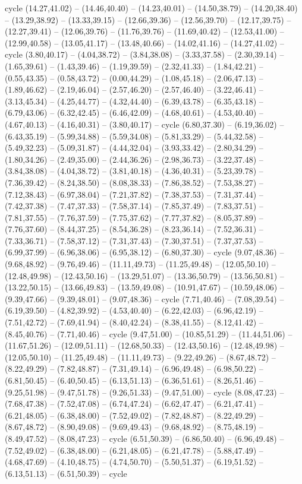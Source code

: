 {cycle (14.27,41.02) -- (14.46,40.40) -- (14.23,40.01) -- (14.50,38.79) -- (14.20,38.40) -- (13.29,38.92) -- (13.33,39.15) -- (12.66,39.36) -- (12.56,39.70) -- (12.17,39.75) -- (12.27,39.41) -- (12.06,39.76) -- (11.76,39.76) -- (11.69,40.42) -- (12.53,41.00) -- (12.99,40.58) -- (13.05,41.17) -- (13.48,40.66) -- (14.02,41.16) -- (14.27,41.02) -- cycle (3.80,40.17) -- (4.04,38.72) -- (3.84,38.08) -- (3.33,37.58) -- (2.30,39.14) -- (1.65,39.61) -- (1.43,39.46) -- (1.19,39.59) -- (2.32,41.33) -- (1.84,42.21) -- (0.55,43.35) -- (0.58,43.72) -- (0.00,44.29) -- (1.08,45.18) -- (2.06,47.13) -- (1.89,46.62) -- (2.19,46.04) -- (2.57,46.20) -- (2.57,46.40) -- (3.22,46.41) -- (3.13,45.34) -- (4.25,44.77) -- (4.32,44.40) -- (6.39,43.78) -- (6.35,43.18) -- (6.79,43.06) -- (6.32,42.45) -- (6.46,42.09) -- (4.68,40.61) -- (4.53,40.40) -- (4.67,40.13) -- (4.16,40.31) -- (3.80,40.17) -- cycle (6.80,37.30) -- (6.19,36.02) -- (6.43,35.19) -- (5.99,34.88) -- (5.59,34.08) -- (5.81,33.29) -- (5.44,32.58) -- (5.49,32.23) -- (5.09,31.87) -- (4.44,32.04) -- (3.93,33.42) -- (2.80,34.29) -- (1.80,34.26) -- (2.49,35.00) -- (2.44,36.26) -- (2.98,36.73) -- (3.22,37.48) -- (3.84,38.08) -- (4.04,38.72) -- (3.81,40.18) -- (4.36,40.31) -- (5.23,39.78) -- (7.36,39.42) -- (8.24,38.50) -- (8.08,38.33) -- (7.86,38.52) -- (7.53,38.27) -- (7.12,38.43) -- (6.97,38.04) -- (7.21,37.82) -- (7.38,37.53) -- (7.31,37.44) -- (7.42,37.38) -- (7.47,37.33) -- (7.58,37.14) -- (7.85,37.49) -- (7.83,37.51) -- (7.81,37.55) -- (7.76,37.59) -- (7.75,37.62) -- (7.77,37.82) -- (8.05,37.89) -- (7.76,37.60) -- (8.44,37.25) -- (8.54,36.28) -- (8.23,36.14) -- (7.52,36.31) -- (7.33,36.71) -- (7.58,37.12) -- (7.31,37.43) -- (7.30,37.51) -- (7.37,37.53) -- (6.99,37.99) -- (6.96,38.06) -- (6.95,38.12) -- (6.80,37.30) -- cycle (9.07,48.36) -- (9.68,48.92) -- (9.76,49.46) -- (11.11,49.73) -- (11.25,49.48) -- (12.05,50.10) -- (12.48,49.98) -- (12.43,50.16) -- (13.29,51.07) -- (13.36,50.79) -- (13.56,50.81) -- (13.22,50.15) -- (13.66,49.83) -- (13.59,49.08) -- (10.91,47.67) -- (10.59,48.06) -- (9.39,47.66) -- (9.39,48.01) -- (9.07,48.36) -- cycle (7.71,40.46) -- (7.08,39.54) -- (6.19,39.50) -- (4.82,39.92) -- (4.53,40.40) -- (6.22,42.03) -- (6.96,42.19) -- (7.51,42.72) -- (7.69,41.94) -- (8.40,42.24) -- (8.38,41.55) -- (8.12,41.42) -- (8.45,40.76) -- (7.71,40.46) -- cycle (9.47,51.00) -- (10.85,51.29) -- (11.44,51.06) -- (11.67,51.26) -- (12.09,51.11) -- (12.68,50.33) -- (12.43,50.16) -- (12.48,49.98) -- (12.05,50.10) -- (11.25,49.48) -- (11.11,49.73) -- (9.22,49.26) -- (8.67,48.72) -- (8.22,49.29) -- (7.82,48.87) -- (7.31,49.14) -- (6.96,49.48) -- (6.98,50.22) -- (6.81,50.45) -- (6.40,50.45) -- (6.13,51.13) -- (6.36,51.61) -- (8.26,51.46) -- (9.25,51.98) -- (9.47,51.78) -- (9.26,51.33) -- (9.47,51.00) -- cycle (8.08,47.23) -- (7.68,47.38) -- (7.52,47.08) -- (6.74,47.24) -- (6.62,47.47) -- (6.21,47.41) -- (6.21,48.05) -- (6.38,48.00) -- (7.52,49.02) -- (7.82,48.87) -- (8.22,49.29) -- (8.67,48.72) -- (8.90,49.08) -- (9.69,49.43) -- (9.68,48.92) -- (8.75,48.19) -- (8.49,47.52) -- (8.08,47.23) -- cycle (6.51,50.39) -- (6.86,50.40) -- (6.96,49.48) -- (7.52,49.02) -- (6.38,48.00) -- (6.21,48.05) -- (6.21,47.78) -- (5.88,47.49) -- (4.68,47.69) -- (4.10,48.75) -- (4.74,50.70) -- (5.50,51.37) -- (6.19,51.52) -- (6.13,51.13) -- (6.51,50.39) -- cycle }
